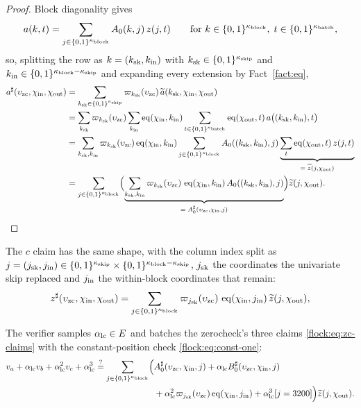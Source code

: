 \begin{proof}
Block diagonality gives
\[
a(k,t)=\sum_{j\in\cube{\kblock}}A_0(k,j)\,z(j,t)\qquad\text{for }k\in\cube{\kblock},\;t\in\cube{\kbatch},
\]
so, splitting the row as $k=(\ksk,\kin)$ with $\ksk\in\cube{\kskip}$ and $\kin\in\cube{\kblock-\kskip}$ and expanding every extension by Fact~\ref{fact:eq},
\begin{align*}
\qext a(\zskip,\fc_{\mathrm{in}},\fc_{\mathrm{out}})&=\sum_{\ksk\in\cube{\kskip}}\lag_{\ksk}(\zskip)\,\mle a(\ksk,\fc_{\mathrm{in}},\fc_{\mathrm{out}})\\
&=\sum_{\ksk}\lag_{\ksk}(\zskip)\sum_{\kin}\eq(\fc_{\mathrm{in}},\kin)\sum_{t\in\cube{\kbatch}}\eq(\fc_{\mathrm{out}},t)\,a\bigl((\ksk,\kin),t\bigr)\\
&=\sum_{\ksk,\kin}\lag_{\ksk}(\zskip)\eq(\fc_{\mathrm{in}},\kin)\sum_{j\in\cube{\kblock}}A_0((\ksk,\kin),j)\underbrace{\sum_{t}\eq(\fc_{\mathrm{out}},t)\,z(j,t)}_{=\;\mle z(j,\fc_{\mathrm{out}})}\\
&=\sum_{j\in\cube{\kblock}}\Bigl(\underbrace{\sum_{\ksk,\kin}\lag_{\ksk}(\zskip)\,\eq(\fc_{\mathrm{in}},\kin)\,A_0((\ksk,\kin),j)}_{=\;\qext A_0(\zskip,\fc_{\mathrm{in}},j)}\Bigr)\mle z(j,\fc_{\mathrm{out}}).
\end{align*}
\end{proof}

The $c$ claim has the same shape, with the column index split as $j=(\jsk,\jin) \in\cube{\kskip} \times \cube{\kblock-\kskip}$, $\jsk$ the coordinates the univariate skip replaced and $\jin$ the within-block coordinates that remain:
\begin{equation}\label{flock:eq:c-as-column}
\qext z(\zskip,\fc_{\mathrm{in}},\fc_{\mathrm{out}})=\sum_{j\in\cube{\kblock}}\lag_{\jsk}(\zskip)\,\eq(\fc_{\mathrm{in}},\jin)\,\mle z(j,\fc_{\mathrm{out}}),
\end{equation}

\vspace{3mm}

The verifier samples $\lcalpha\in\E$ and batches the zerocheck's three claims \eqref{flock:eq:zc-claims} with the constant-position check \eqref{flock:eq:const-one}:
\begin{equation}\label{flock:eq:lincheck}
\begin{split}
v_a+\lcalpha v_b+\lcalpha^2v_c+\lcalpha^3\qeq\sum_{j\in\cube{\kblock}}\Bigl(&\qext A_0(\zskip,\fc_{\mathrm{in}},j)+\lcalpha\qext B_0(\zskip,\fc_{\mathrm{in}},j)\\
&+\lcalpha^2\lag_{\jsk}(\zskip)\eq(\fc_{\mathrm{in}},\jin)+\lcalpha^3[j=3200]\Bigr)\mle z(j,\fc_{\mathrm{out}}).
\end{split}
\end{equation}

